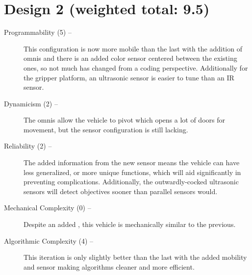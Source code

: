 \documentclass[11pt]{report}
\begin{document}
\section{Design 2 (weighted total: 9.5)}\label{matrixdesign2}
\begin{greylineformat}
\begin{description}
    \item[Programmability (5) --]This configuration is now more mobile than the last with the addition of \glspl{omni} and there is an added color sensor centered between the existing ones, so not much has changed from a coding perspective. Additionally for the gripper platform, an ultrasonic sensor is easier to tune than an \gls{IR} sensor.
    \item[Dynamicism (2) --] The \glspl{omni} allow the vehicle to pivot which opens a lot of doors for movement, but the sensor configuration is still lacking.
    \item[Reliability (2) --] The added information from the new sensor means the vehicle can have less generalized, or more unique functions, which will aid significantly in preventing complications. Additionally, the outwardly-cocked ultrasonic sensors will detect objectives sooner than parallel sensors would.
    \item[Mechanical Complexity (0) --]Despite an added , this vehicle is mechanically similar to the previous. 
    \item[Algorithmic Complexity (4) --]This iteration is only slightly better than the last with the added mobility and sensor making algorithms cleaner and more efficient.
\end{description}
\end{greylineformat}
\end{document}
